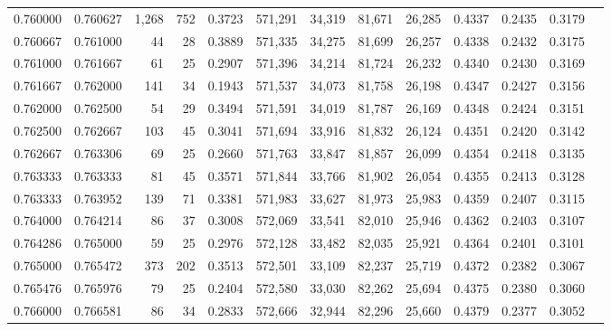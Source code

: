 \begin{tabular}{rrrrrrrrrrrrr}
0.760000 & 0.760627 & 1,268 & 752 &                                     0.3723 & 571,291 &  34,319 &  81,671 &  26,285 & 0.4337 & 0.2435 & 0.3179 \\
0.760667 & 0.761000 &    44 &  28 &                                     0.3889 & 571,335 &  34,275 &  81,699 &  26,257 & 0.4338 & 0.2432 & 0.3175 \\
0.761000 & 0.761667 &    61 &  25 &                                     0.2907 & 571,396 &  34,214 &  81,724 &  26,232 & 0.4340 & 0.2430 & 0.3169 \\
0.761667 & 0.762000 &   141 &  34 &                                     0.1943 & 571,537 &  34,073 &  81,758 &  26,198 & 0.4347 & 0.2427 & 0.3156 \\
0.762000 & 0.762500 &    54 &  29 &                                     0.3494 & 571,591 &  34,019 &  81,787 &  26,169 & 0.4348 & 0.2424 & 0.3151 \\
0.762500 & 0.762667 &   103 &  45 &                                     0.3041 & 571,694 &  33,916 &  81,832 &  26,124 & 0.4351 & 0.2420 & 0.3142 \\
0.762667 & 0.763306 &    69 &  25 &                                     0.2660 & 571,763 &  33,847 &  81,857 &  26,099 & 0.4354 & 0.2418 & 0.3135 \\
0.763333 & 0.763333 &    81 &  45 &                                     0.3571 & 571,844 &  33,766 &  81,902 &  26,054 & 0.4355 & 0.2413 & 0.3128 \\
0.763333 & 0.763952 &   139 &  71 &                                     0.3381 & 571,983 &  33,627 &  81,973 &  25,983 & 0.4359 & 0.2407 & 0.3115 \\
0.764000 & 0.764214 &    86 &  37 &                                     0.3008 & 572,069 &  33,541 &  82,010 &  25,946 & 0.4362 & 0.2403 & 0.3107 \\
0.764286 & 0.765000 &    59 &  25 &                                     0.2976 & 572,128 &  33,482 &  82,035 &  25,921 & 0.4364 & 0.2401 & 0.3101 \\
0.765000 & 0.765472 &   373 & 202 &                                     0.3513 & 572,501 &  33,109 &  82,237 &  25,719 & 0.4372 & 0.2382 & 0.3067 \\
0.765476 & 0.765976 &    79 &  25 &                                     0.2404 & 572,580 &  33,030 &  82,262 &  25,694 & 0.4375 & 0.2380 & 0.3060 \\
0.766000 & 0.766581 &    86 &  34 &                                     0.2833 & 572,666 &  32,944 &  82,296 &  25,660 & 0.4379 & 0.2377 & 0.3052 \\

\end{tabular}
